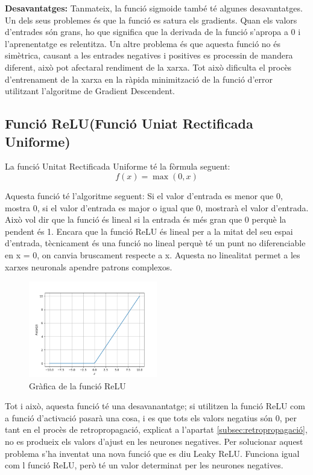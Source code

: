 {\textbf{Desavantatges:}
Tanmateix, la funció sigmoide també té algunes desavantatges. Un dels seus problemes és que la funció es satura els gradients. Quan els valors d'entrades són grans, ho que significa que la derivada de la funció s'apropa a 0 i l'aprenentatge es relentitza. Un altre problema és que aquesta funció no és simètrica, causant a les entrades negatives i positives es processin de mandera diferent, això pot afectaral rendiment de la xarxa. Tot això dificulta el procès d'entrenament de la xarxa en la ràpida minimització de la funció d'error utilitzant l'algoritme de Gradient Descendent.
\subsection{Funció ReLU(Funció Uniat Rectificada Uniforme)}\label{subsec:1}
La funció Unitat Rectificada Uniforme té la fòrmula seguent:
\[ f(x) = \max(0, x) \]

Aquesta funció té l'algoritme seguent: Si el valor d'entrada es menor que 0, mostra 0, si el valor d'entrada es major o igual que 0, mostrarà el valor d'entrada. Això vol dir que la funció és lineal si la entrada és més gran que 0 perquè la pendent és 1. Encara que la funció ReLU és lineal per a la mitat del seu espai d'entrada, tècnicament és una funció no lineal perquè té un punt no diferenciable en x = 0, on canvia bruscament respecte a x. Aquesta no linealitat permet a les xarxes neuronals apendre patrons complexos.

\begin{figure}[h!]
    \centering
    \includegraphics[width=0.5\textwidth]{./figures/ReLU.png}
    \caption{Gràfica de la funció ReLU}
\end{figure}

Tot i això, aquesta funció té una desavanantatge; si utilitzen la funció ReLU com a funció d'activació pasarà una cosa, i es que tots els valors negatius són 0, per tant en el procès de retropropagació, explicat a l'apartat \ref{subsec:retropropagació}, no es produeix els valors d'ajust en les neurones negatives. Per solucionar aquest problema s'ha inventat una nova funció que es diu Leaky ReLU. Funciona igual com l funció ReLU, però té un valor determinat per les neurones negatives.

}

